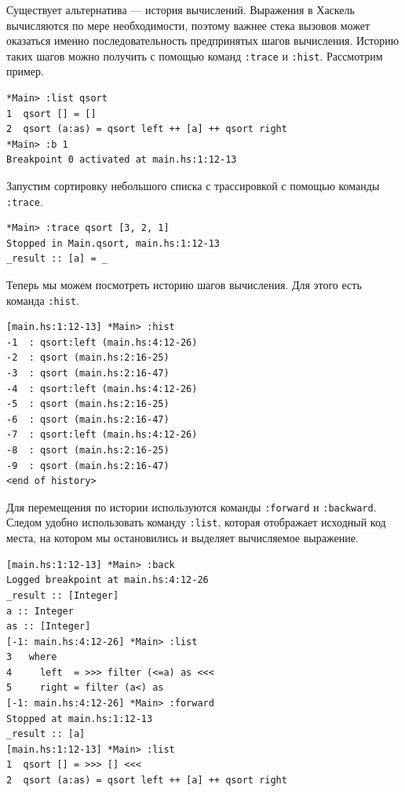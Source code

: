 \documentclass[fontsize=14pt, paper=a4, pagesize, DIV=calc]{scrartcl}
\def\code#1{\texttt{#1}}
\begin{document}
Существует альтернатива --- история вычислений. Выражения в Хаскель вычисляются
по мере необходимости, поэтому важнее стека вызовов может оказаться именно
последовательность предпринятых шагов вычисления. Историю таких шагов можно
получить с помощью команд \code{:trace} и \code{:hist}. Рассмотрим пример.

\begin{ListingEnv}
\caption{}
\begin{lstlisting}[numbers=none]
*Main> :list qsort
1  qsort [] = []
2  qsort (a:as) = qsort left ++ [a] ++ qsort right
*Main> :b 1
Breakpoint 0 activated at main.hs:1:12-13
\end{lstlisting}
\end{ListingEnv}

Запустим сортировку небольшого списка с трассировкой с помощью команды \code{:trace}.

\begin{ListingEnv}
\caption{}
\begin{lstlisting}[numbers=none]
*Main> :trace qsort [3, 2, 1]
Stopped in Main.qsort, main.hs:1:12-13
_result :: [a] = _
\end{lstlisting}
\end{ListingEnv}

Теперь мы можем посмотреть историю шагов вычисления. Для этого есть команда
\code{:hist}.

\begin{ListingEnv}
\caption{}
\begin{lstlisting}[numbers=none]
[main.hs:1:12-13] *Main> :hist
-1  : qsort:left (main.hs:4:12-26)
-2  : qsort (main.hs:2:16-25)
-3  : qsort (main.hs:2:16-47)
-4  : qsort:left (main.hs:4:12-26)
-5  : qsort (main.hs:2:16-25)
-6  : qsort (main.hs:2:16-47)
-7  : qsort:left (main.hs:4:12-26)
-8  : qsort (main.hs:2:16-25)
-9  : qsort (main.hs:2:16-47)
<end of history> 
\end{lstlisting}
\end{ListingEnv}

Для перемещения по истории используются команды \code{:forward} и
\code{:backward}. Следом удобно использовать команду \code{:list}, которая
отображает исходный код места, на котором мы остановились и выделяет 
вычисляемое выражение.

\begin{ListingEnv}
\caption{}
\begin{lstlisting}[numbers=none]
[main.hs:1:12-13] *Main> :back
Logged breakpoint at main.hs:4:12-26
_result :: [Integer]
a :: Integer
as :: [Integer]
[-1: main.hs:4:12-26] *Main> :list
3   where
4     left  = >>> filter (<=a) as <<<
5     right = filter (a<) as
[-1: main.hs:4:12-26] *Main> :forward
Stopped at main.hs:1:12-13
_result :: [a]
[main.hs:1:12-13] *Main> :list
1  qsort [] = >>> [] <<<
2  qsort (a:as) = qsort left ++ [a] ++ qsort right
\end{lstlisting}
\end{ListingEnv}
\end{document}
